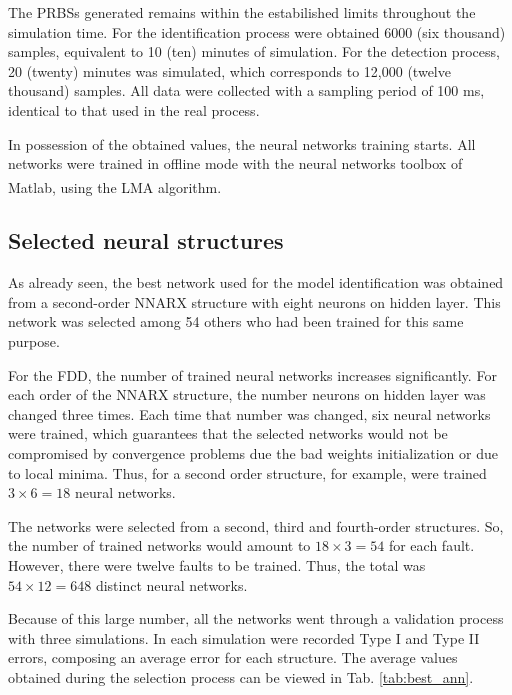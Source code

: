 \documentclass[10pt,fleqn,a4paper]{article}
\newcommand{\reg}{\textsuperscript{\textregistered}}
\begin{document}
The PRBSs generated remains within the estabilished limits throughout the
simulation time. For the identification process were obtained 6000 (six
thousand) samples, equivalent to 10 (ten) minutes of simulation. For the
detection process, 20 (twenty) minutes was simulated, which corresponds to
12,000 (twelve thousand) samples. All data were collected with a sampling period
of 100 ms, identical to that used in the real process.

In possession of the obtained values, the neural networks training starts. All
networks were trained in offline mode with the neural networks toolbox of
Matlab\reg, using the LMA algorithm.

\subsection{Selected neural structures}
As already seen, the best network used for the model identification was obtained
from a second-order NNARX structure with eight neurons on hidden layer. This
network was selected among 54 others who had been trained for this same purpose.

For the FDD, the number of trained neural networks increases significantly. For
each order of the NNARX structure, the number neurons on hidden layer was
changed three times. Each time that number was changed, six neural networks were
trained, which guarantees that the selected networks would not be compromised by
convergence problems due the bad weights initialization or due to local minima.
Thus, for a second order structure, for example, were trained $3 \times 6 = 18$
neural networks.

The networks were selected from a second, third and fourth-order structures. So,
the number of trained networks would amount to $18 \times 3 = 54$ for each
fault. However, there were twelve faults to be trained. Thus, the total was $54
\times 12 = 648$ distinct neural networks.

Because of this large number, all the networks went through a validation process
with three simulations. In each simulation were recorded Type I and Type II
errors, composing an average error for each structure. The average values
obtained during the selection process can be viewed in Tab. \ref{tab:best_ann}.
\end{document}
